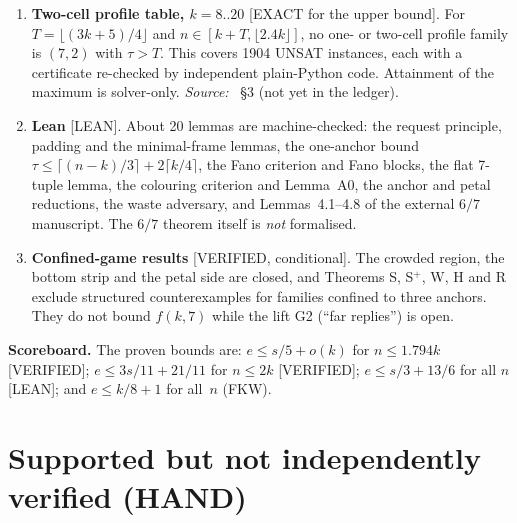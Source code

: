 \documentclass[11pt]{article}
\newcommand{\st}[1]{\textsf{\small[#1]}}
\newcommand{\f}[1]{\path{#1}}
\begin{document}
\begin{enumerate}
\item \textbf{Two-cell profile table, $k=8..20$} \st{EXACT for the upper bound}. For $T=\lfloor(3k+5)/4\rfloor$ and
$n\in[k+T,\lfloor2.4k\rfloor]$, no one- or two-cell profile family is $(7,2)$ with $\tau>T$. This covers 1904 UNSAT
instances, each with a certificate re-checked by independent plain-Python code. Attainment of the maximum is
solver-only. \emph{Source:} \f{notes/PROGRAMME4_CELLS.md}~\S3 (not yet in the ledger).
\item \textbf{Lean} \st{LEAN}. About 20 lemmas are machine-checked: the request principle, padding and the minimal-frame
lemmas, the one-anchor bound $\tau\le\lceil(n-k)/3\rceil+2\lceil k/4\rceil$, the Fano criterion and Fano blocks, the
flat 7-tuple lemma, the colouring criterion and Lemma~A0, the anchor and petal reductions, the waste adversary, and
Lemmas~4.1--4.8 of the external $6/7$ manuscript. The $6/7$ theorem itself is \emph{not} formalised.
\item \textbf{Confined-game results} \st{VERIFIED, conditional}. The crowded region, the bottom strip and the petal
side are closed, and Theorems S, S$^+$, W, H and R exclude structured counterexamples for families confined to three
anchors. They do not bound $f(k,7)$ while the lift G2 (``far replies'') is open.
\end{enumerate}

\noindent\textbf{Scoreboard.} The proven bounds are: $e\le s/5+o(k)$ for $n\le1.794k$ \st{VERIFIED};
$e\le3s/11+21/11$ for $n\le2k$ \st{VERIFIED}; $e\le s/3+13/6$ for all $n$ \st{LEAN}; and $e\le k/8+1$ for all~$n$
(FKW).

\section{Supported but not independently verified (HAND)}
\end{document}
